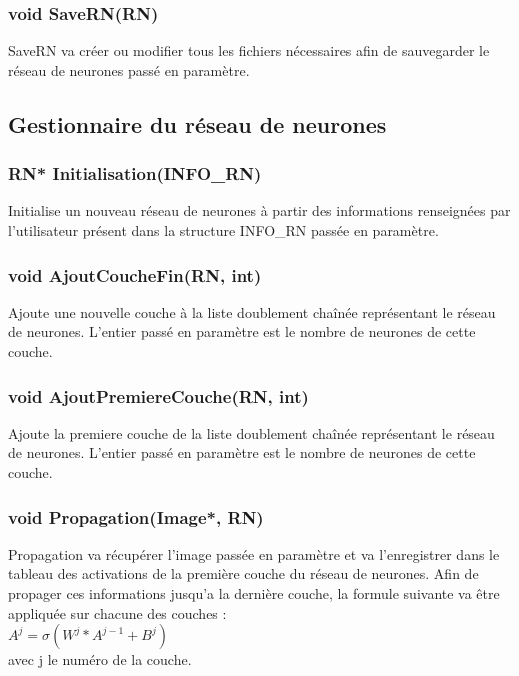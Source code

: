 \documentclass{article}
\begin{document}
		\subsubsection{\textcolor{myblue}{\textbf{void}} SaveRN(\textcolor{myblue}{\textbf{RN}})}
		SaveRN va créer ou modifier tous les fichiers nécessaires afin de sauvegarder le réseau de neurones passé en paramètre.
		
	
	\subsection{Gestionnaire du réseau de neurones}
		\subsubsection{\textcolor{myblue}{\textbf{RN*}} Initialisation(\textcolor{myblue}{\textbf{INFO\_RN}})}
		Initialise un nouveau réseau de neurones à partir des informations renseignées par l'utilisateur présent dans la structure INFO\_RN passée en paramètre.
		
		\subsubsection{\textcolor{myblue}{\textbf{void}} AjoutCoucheFin(\textcolor{myblue}{\textbf{RN}}, \textcolor{myblue}{\textbf{int}})}
		Ajoute une nouvelle couche à la liste doublement chaînée représentant le réseau de neurones. L'entier passé en paramètre est le nombre de neurones de cette couche.
		
		\subsubsection{\textcolor{myblue}{\textbf{void}} AjoutPremiereCouche(\textcolor{myblue}{\textbf{RN}}, \textcolor{myblue}{\textbf{int}})}
		Ajoute la premiere couche de la liste doublement chaînée représentant le réseau de neurones. L'entier passé en paramètre est le nombre de neurones de cette couche.
		
		\subsubsection{\textcolor{myblue}{\textbf{void}} Propagation(\textcolor{myblue}{\textbf{Image*}}, \textcolor{myblue}{\textbf{RN}})}
		Propagation va récupérer l'image passée en paramètre et va l'enregistrer dans le tableau des activations de la première couche du réseau de neurones.
		Afin de propager ces informations jusqu'a la dernière couche, la formule suivante va être appliquée sur chacune des couches :\\ $A^j = \sigma(W^j*A^{j-1}+B^j)$\\
		avec j le numéro de la couche.
		
\end{document}
